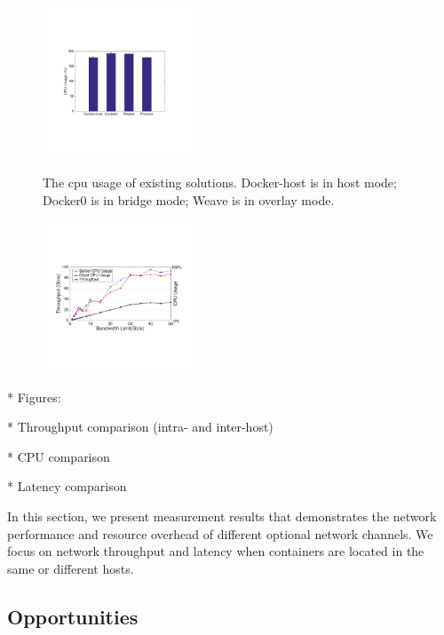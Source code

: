 \begin{figure}[ht]
     \centering 
     \includegraphics[width=0.4\textwidth]{figures/motivation/eval_exist_cpu.pdf} 
     \label{fig:eval_exist_cpu}
     \caption{The cpu usage of existing solutions. Docker-host is in host mode; Docker0 is in bridge mode; Weave is in overlay mode.} 
\end{figure} 

\begin{figure}[ht]
     \centering 
     \includegraphics[width=0.4\textwidth]{figures/motivation/eval_bw_cpu.pdf}      
     \label{fig:eval_bw_cpu}
     \caption{} 
\end{figure}


* Figures:

* Throughput comparison (intra- and inter-host)

* CPU comparison

* Latency comparison

In this section, we present measurement results that demonstrates the network performance and resource overhead of different optional network channels. We focus on network throughput and latency when containers are located in the same or different hosts. 




\subsection{Opportunities}

